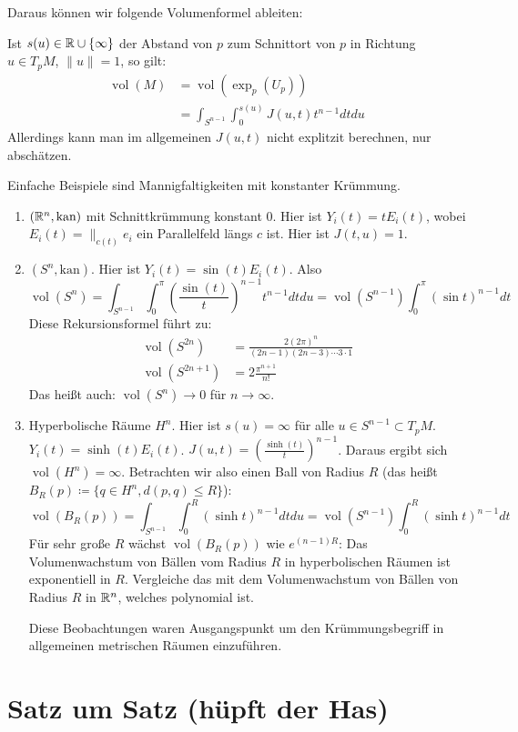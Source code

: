 \documentclass[a4paper,twoside,DIV15,BCOR12mm]{scrbook}
\renewcommand{\da}{\coloneqq}
\newcommand{\kan}{\text{kan}}
\DeclareMathOperator{\vol}{vol}
\begin{document}
Daraus können wir folgende Volumenformel ableiten:

Ist $s(u) \in \mathbb{R}\cup\{\infty\}$ der Abstand von $p$ zum Schnittort von $p$ in Richtung $u\in T_pM$, $\|u\|=1$, so gilt:
\begin{align*}
\vol(M) &= \vol(\exp_p(U_p)) \\
&= \int_{S^{n-1}} \int_0^{s(u)} J(u,t) t^{n-1} dt du
\end{align*}
Allerdings kann man im allgemeinen $J(u,t)$ nicht explitzit berechnen, nur abschätzen.

Einfache Beispiele sind Mannigfaltigkeiten mit konstanter Krümmung.
\begin{enumerate}
\item $(\MdR^n,\kan)$ mit Schnittkrümmung konstant 0. Hier ist $Y _i(t) = t E_i(t)$, wobei $E_i(t) = \|_{c(t)}e_i$ ein Parallelfeld längs $c$ ist. Hier ist $J(t,u)=1$. 
\item $(S^n,\kan)$. Hier ist $Y_i(t) = \sin(t) E_i(t)$. Also 
\[ \vol(S^n)= \int_{S^{n-1}} \int_0^\pi \left(\frac{\sin(t)}{t}\right)^{n-1} t^{n-1} dt du = \vol(S^{n-1}) \int_0^\pi (\sin t)^{n-1}dt \]
Diese Rekursionsformel führt zu:
\begin{align*}
\vol(S^{2n}) &= \frac {2 (2\pi)^n} {(2n-1)(2n-3)\cdots 3\cdot 1} \\
\vol(S^{2n+1}) &= 2\frac {\pi^{n+1}} {n!}
\end{align*}
Das heißt auch: $\vol(S^n)\to 0$ für $n\to \infty$.
\item Hyperbolische Räume $H^n$. Hier ist $s(u)=\infty$ für alle $u\in S^{n-1}\subset T_pM$. $Y_i(t) = \sinh(t)E_i(t)$. $J(u,t) = \left( \frac {\sinh(t)} t \right)^{n-1}$.
Daraus ergibt sich $\vol(H^n)=\infty$. Betrachten wir also einen Ball von Radius $R$ (das heißt $B_R(p) \da \{ q\in H^n, d(p,q)\le R\}$):
\[
\vol(B_R(p)) = \int_{S^{n-1}} \int_0^R (\sinh t)^{n-1} dt du = \vol(S^{n-1}) \int_0^R (\sinh t)^{n-1} dt
\]
Für sehr große $R$ wächst $\vol(B_R(p))$ wie $e^{(n-1)R}$: Das Volumenwachstum von Bällen vom Radius $R$ in hyperbolischen Räumen ist exponentiell in $R$. Vergleiche das mit dem Volumenwachstum von Bällen von Radius $R$ in $\mathbb{R}^n$, welches polynomial ist.

Diese Beobachtungen waren Ausgangspunkt um den Krümmungsbegriff in allgemeinen metrischen Räumen einzuführen.
\end{enumerate}


\appendix

\chapter{Satz um Satz (hüpft der Has)}

\renewcommand{\indexname}{Stichwortverzeichnis}
\addtocounter{chapter}{1}
\printindex
\end{document}

